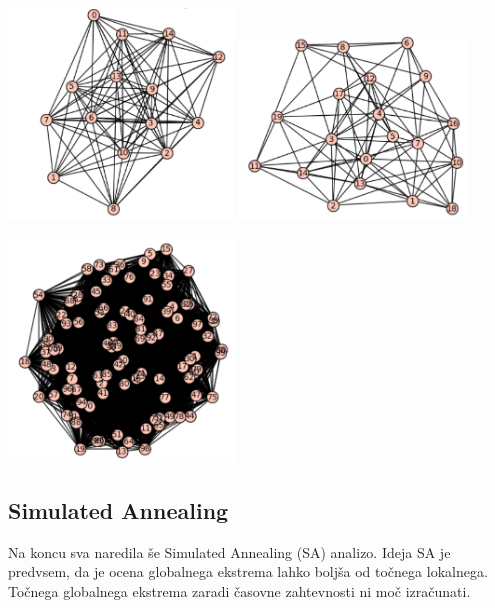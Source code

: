\documentclass[10pt, a4paper]{article}
\begin{document}
\begin{center}
\includegraphics[width=6cm]{graf_15_2}
\includegraphics[width=6cm]{graf_20_2}
\end{center}

\begin{center}
\includegraphics[width=6cm]{graf_100_2}
\end{center}

\subsection{Simulated Annealing}
Na koncu sva naredila še Simulated Annealing (SA) analizo. Ideja SA je predvsem, da je ocena globalnega ekstrema lahko boljša od točnega lokalnega. Točnega globalnega ekstrema zaradi časovne zahtevnosti ni moč izračunati.

\pagebreak
\end{document}
